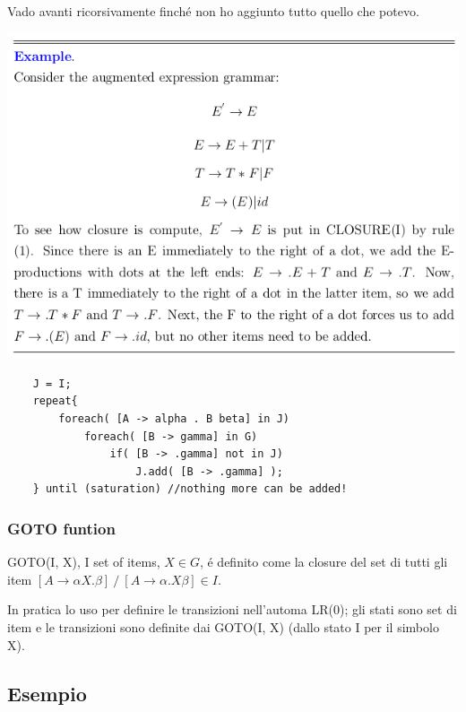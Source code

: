 Vado avanti ricorsivamente finch\'e non ho aggiunto tutto quello che potevo.

\begin{center}
    \includegraphics[scale=0.6]{Chapters/Img/c04_06.png}\\
\end{center}

\begin{lstlisting}
    J = I;
    repeat{
        foreach( [A -> alpha . B beta] in J) 
            foreach( [B -> gamma] in G)
                if( [B -> .gamma] not in J)
                    J.add( [B -> .gamma] );
    } until (saturation) //nothing more can be added!
\end{lstlisting}

\subsubsection{GOTO funtion}
GOTO(I, X), I set of items, $X \in G$, \'e definito come la closure del set di tutti gli item 
$[A \rightarrow \alpha X. \beta] \ / \ [A \rightarrow \alpha.X \beta] \in I $. 

In pratica lo uso per definire le transizioni nell'automa LR(0); gli stati sono set di item e le transizioni sono definite dai GOTO(I, X) 
(dallo stato I per il simbolo X).

\subsection{Esempio}

